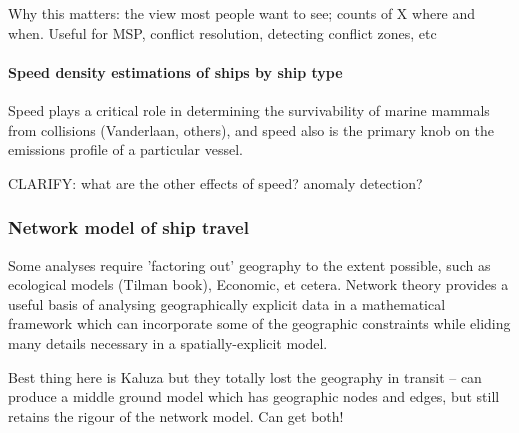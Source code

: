 Why this matters: the view most people want to see; counts of X where and when. Useful for MSP, conflict resolution, detecting conflict zones, etc

\paragraph{Speed density estimations of ships by ship type}

Speed plays a critical role in determining the survivability of marine mammals from collisions (Vanderlaan, others), and speed also is the primary knob on the emissions profile of a particular vessel.

CLARIFY: what are the other effects of speed? anomaly detection?

\subsubsection{Network model of ship travel}

Some analyses require 'factoring out' geography to the extent possible, such as ecological models (Tilman book), Economic, et cetera. Network theory provides a useful basis of analysing geographically explicit data in a mathematical framework which can incorporate some of the geographic constraints while eliding many details necessary in a spatially-explicit model.

Best thing here is Kaluza but they totally lost the geography in transit -- can produce a middle ground model which has geographic nodes and edges, but still retains the rigour of the network model. Can get both!





